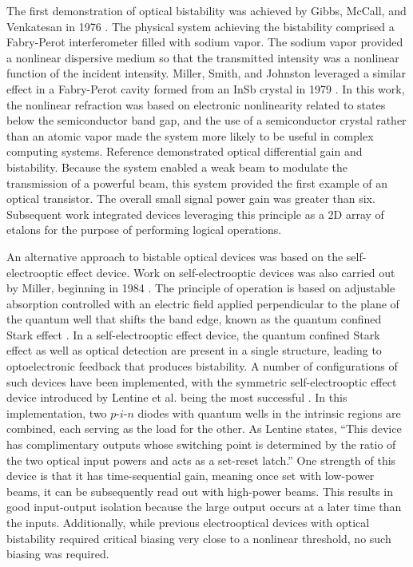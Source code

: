 The first demonstration of optical bistability was achieved by Gibbs, McCall, and Venkatesan in 1976 \cite{gimc1976}. The physical system achieving the bistability comprised a Fabry-Perot interferometer filled with sodium vapor. The sodium vapor provided a nonlinear dispersive medium so that the transmitted intensity was a nonlinear function of the incident intensity. Miller, Smith, and Johnston leveraged a similar effect in a Fabry-Perot cavity formed from an InSb crystal in 1979 \cite{mism1979}. In this work, the nonlinear refraction was based on electronic nonlinearity related to states below the semiconductor band gap, and the use of a semiconductor crystal rather than an atomic vapor made the system more likely to be useful in complex computing systems. Reference  demonstrated optical differential gain and bistability. Because the system enabled a weak beam to modulate the transmission of a powerful beam, this system provided the first example of an optical transistor. The overall small signal power gain was greater than six. Subsequent work integrated devices leveraging this principle as a 2D array of etalons \cite{jele1986,vewi1986} for the purpose of performing logical operations. 

An alternative approach to bistable optical devices was based on the self-electrooptic effect device. Work on self-electrooptic devices was also carried out by Miller, beginning in 1984 \cite{mich1984}. The principle of operation is based on adjustable absorption controlled with an electric field applied perpendicular to the plane of the quantum well that shifts the band edge, known as the quantum confined Stark effect \cite{mich1984b}. In a self-electrooptic effect device, the quantum confined Stark effect as well as optical detection are present in a single structure, leading to optoelectronic feedback that produces bistability. A number of configurations of such devices have been implemented, with the symmetric self-electrooptic effect device introduced by Lentine et al. being the most successful \cite{lehi1988,lehi1989}. In this implementation, two $p$-$i$-$n$ diodes with quantum wells in the intrinsic regions are combined, each serving as the load for the other. As Lentine states, ``This device has complimentary outputs whose switching point is determined by the ratio of the two optical input powers and acts as a set-reset latch.'' One strength of this device is that it has time-sequential gain, meaning once set with low-power beams, it can be subsequently read out with high-power beams. This results in good input-output isolation because the large output occurs at a later time than the inputs. Additionally, while previous electrooptical devices with optical bistability required critical biasing very close to a nonlinear threshold, no such biasing was required.

